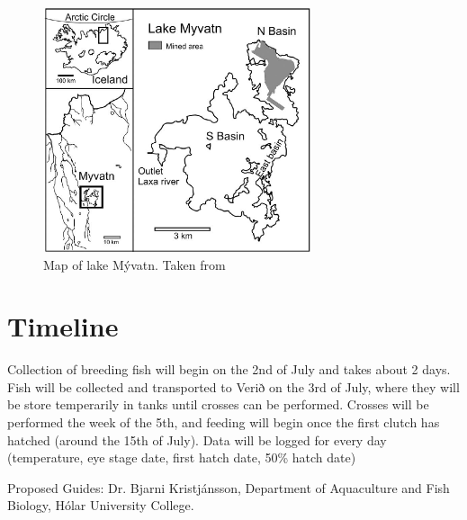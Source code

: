 \documentclass[12pt]{extarticle}
\begin{document}
\begin{figure}
\centering
 \includegraphics[width=0.7\textwidth]{lake}
 \caption{Map of lake M\'yvatn. Taken from \citet{Einarsson2004}}
  \label{fig:pedigree1}
\end{figure}

\section{Timeline}
Collection of breeding fish will begin on the 2nd of July and takes about 2 days. Fish will be collected and transported to Verið on the 3rd of July, where they will be store temperarily in tanks until crosses can be performed. Crosses will be performed the week of the 5th, and feeding will begin once the first clutch has hatched (around the 15th of July). Data will be logged for every day (temperature, eye stage date, first hatch date, 50\% hatch date)

Proposed Guides: Dr. Bjarni Kristj\'ansson, Department of Aquaculture and Fish Biology, H\'olar University College.

\end{document}
